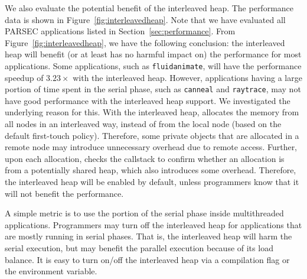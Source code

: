 We also evaluate the potential benefit of the interleaved heap. The performance data is shown in Figure~\ref{fig:interleavedheap}. Note that we have evaluated all PARSEC applications listed in Section~\ref{sec:performance}.
From Figure~\ref{fig:interleavedheap}, we have the following conclusion: the interleaved heap will benefit (or at least has no harmful impact on) the performance for most applications. Some applications, such as \texttt{fluidanimate}, will have the performance speedup of $3.23\times$ with the interleaved heap. However, applications having a large portion of time spent in the serial phase, such as \texttt{canneal} and \texttt{raytrace}, may not have good performance with the interleaved heap support. 
We investigated the underlying reason for this. With the interleaved heap, \NM{} allocates the memory from all nodes in an interleaved way, instead of from the local node (based on the default first-touch policy). Therefore, some private objects that are allocated in a remote node may introduce unnecessary overhead due to remote access. Further, upon each allocation, \NM{}  checks the callstack to confirm whether an allocation is from a potentially shared heap, which also introduces some overhead. Therefore, the interleaved heap will be enabled by default, unless programmers know that it will not benefit the performance.

A simple metric is to use the portion of the serial phase inside multithreaded applications.  Programmers may turn off the interleaved heap for applications that are mostly running in serial phases. That is, the interleaved heap will harm the serial execution, but may benefit the parallel execution because of its load balance. It is easy to turn on/off the interleaved heap via a compilation flag or the environment variable.  








